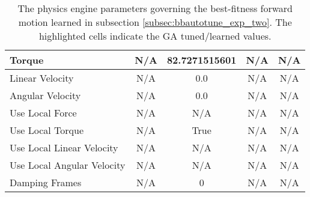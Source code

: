 \begin{table}[htbp]
\begin{tabular}{ | l || c | c | c | c | }
Torque                     & N/A & \cellcolor{lightblue} 82.7271515601 & N/A & N/A \\ \hline
Linear Velocity            & N/A & 0.0    & N/A    & N/A \\ \hline
Angular Velocity           & N/A & 0.0    & N/A    & N/A \\ \hline
Use Local Force            & N/A & N/A    & N/A    & N/A \\ \hline
Use Local Torque           & N/A & True   & N/A    & N/A \\ \hline
Use Local Linear Velocity  & N/A & N/A    & N/A    & N/A \\ \hline
Use Local Angular Velocity & N/A & N/A    & N/A    & N/A \\ \hline
Damping Frames             & N/A & 0      & N/A    & N/A \\ \hline
\end{tabular}
\caption[Physics Engine Parameters Governing Forward Motion Learned]{The physics engine parameters governing the best-fitness forward motion learned in subsection \ref{subsec:bbautotune_exp_two}. The highlighted cells indicate the GA tuned/learned values.}
\label{tab:all_pep_fm_l}
\end{table}